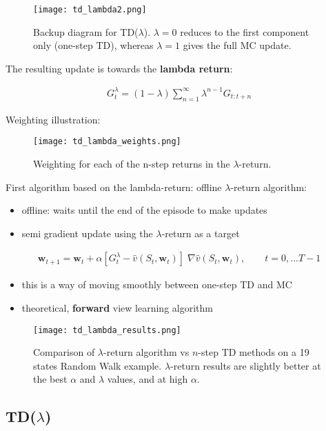 \documentclass[sutton_barto_notes.tex]{subfiles}
\begin{document}
\begin{figure}[h!]
    \centering
     \texttt{[image: td\_lambda2.png]}
    \caption{ Backup diagram for TD($\lambda$). $\lambda = 0$ reduces to the first component only (one-step TD), whereas $\lambda = 1$ gives the full MC update. }
\end{figure}


 The resulting update is towards the \textbf{lambda return}: 

\begin{align}G_t^{\lambda} = (1 - \lambda) \sum_{n=1}^{\infty} \lambda^{n-1} G_{t:t+n} \label{eq:12.2}\tag{12.2}
\end{align}

\newpage
 Weighting illustration: 
\begin{figure}[h!]
    \centering
     \texttt{[image: td\_lambda\_weights.png]}
    \caption{ Weighting for each of the n-step returns in the $\lambda$-return. }
\end{figure}

 First algorithm based on the lambda-return: offline $\lambda$-return algorithm: 
\begin{itemize}
\item offline: waits until the end of the episode to make updates 
\item semi gradient update using the $\lambda$-return as a target 
\end{itemize}
\begin{align}\mathbf{w}_{t+1} = \mathbf{w}_t + \alpha[G_t^{\lambda} - \hat{v}(S_t, \mathbf{w}_t)] \; \nabla \hat{v}(S_t, \mathbf{w}_t), \quad \quad t = 0, ... T-1 \label{eq:12.3}\tag{12.3}\end{align}
\begin{itemize}
\item this is a way of moving smoothly between one-step TD and MC 
\item theoretical, \textbf{forward} view learning algorithm 
\end{itemize}
\begin{figure}[h!]
    \centering
     \texttt{[image: td\_lambda\_results.png]}
    \caption{ Comparison of $\lambda$-return algorithm vs $n$-step TD methods on a 19 states Random Walk example. $\lambda$-return results are slightly better at the best $\alpha$ and $\lambda$ values, and at high $\alpha$. }
\end{figure}

\newpage
\subsection{TD($\lambda$)}
\end{document}
